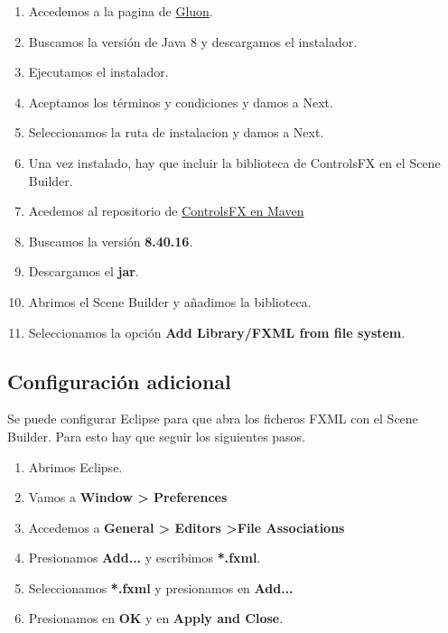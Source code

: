 \begin{enumerate}
	\item Accedemos a la pagina de \href{https://gluonhq.com/products/scene-builder/}{Gluon}.
	\item Buscamos la versión de Java 8 y descargamos el instalador.
	\item Ejecutamos el instalador.
	\item Aceptamos los términos y condiciones y damos a Next.
	\item Seleccionamos la ruta de instalacion y damos a Next.
	\item Una vez instalado, hay que incluir la biblioteca de ControlsFX en el Scene Builder.
	\item Acedemos al repositorio de \href{https://mvnrepository.com/artifact/org.controlsfx/controlsfx}{ControlsFX en Maven}
	\item Buscamos la versión \textbf{8.40.16}.
	\item Descargamos el \textbf{jar}.
	\item Abrimos el Scene Builder y añadimos la biblioteca.
	\item Seleccionamos la opción \textbf{Add Library/FXML from file system}.
\end{enumerate}

\subsection{Configuración adicional}
Se puede configurar Eclipse para que abra los ficheros FXML con el Scene Builder. Para esto hay que seguir los siguientes pasos.
\begin{enumerate}
	\item Abrimos Eclipse.
	\item Vamos a \textbf{Window > Preferences}
	\item Accedemos a \textbf{General > Editors >File Associations}
	\item Presionamos \textbf{Add...} y escribimos \textbf{*.fxml}.
	\item Seleccionamos \textbf{*.fxml} y presionamos en \textbf{Add...}
	\item Presionamos en \textbf{OK} y en \textbf{Apply and Close}.
\end{enumerate}

